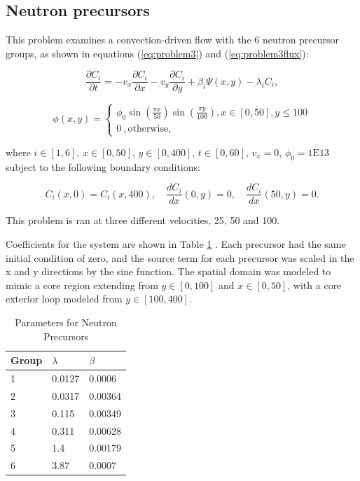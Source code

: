 \subsection{Neutron precursors}
This problem examines a convection-driven flow with the 6 neutron precursor groups, as shown in equations (\ref{eq:problem3}) and (\ref{eq:problem3flux}): 

\begin{equation}
\frac{\partial C_{i}}{\partial t} = -v_{x}\frac{\partial C_{i}}{\partial x} - v_{y}\frac{\partial C_{i}}{\partial y} + \beta_{i} \Psi (x, y) -\lambda_i C_{i},
\label{eq:problem3}
\end{equation}

\begin{equation}
\phi (x, y) = \begin{cases}
  \phi _0 \sin\left(\frac{\pi x}{50}\right)\sin\left(\frac{\pi y}{100}\right) , x \in [0,50], y \le 100 \\
  0\ , \text{otherwise},
  \label{eq:problem3flux}
\end{cases}
\end{equation}

\noindent where $i \in [1,6]$, $x \in [0, 50]$, $y \in [0, 400]$, $t \in [0, 60]$, $v_{x} = 0$, $\phi_0 = 1\text{E}13$ subject to the following boundary conditions:

\begin{equation}
    C_{i}(x,0) = C_{i}(x,400), \quad \frac{dC_{i}}{dx}(0,y) = 0, \quad \frac{dC_{i}}{dx}(50, y) = 0.
\end{equation}

\noindent This problem is ran at three different velocities, 25, 50 and 100. 

Coefficients for the system are shown in Table \ref{tab:precursorCoeffs} \cite{ott1985}. 
Each precursor had the same initial condition of zero, and the source term for each precursor was scaled in the x and y directions by the sine function. The spatial domain was modeled to mimic a core region extending from $y \in [0,100]$ and $x \in [0,50]$, with a core exterior loop modeled from $y \in [100, 400]$. 

\begin{table}[h!]
   \caption{\label{tab:precursorCoeffs} Parameters for Neutron Precursors}
   \centering
   \begin{tabular}{lll}
   \hline
   Group & $\lambda$ & $\beta$ \\
   \hline
   1 & 0.0127 & 0.0006 \\
   2 & 0.0317 & 0.00364 \\
   3 & 0.115 & 0.00349 \\
   4 & 0.311& 0.00628 \\
   5 & 1.4 & 0.00179\\
   6 & 3.87 & 0.0007 \\
   \hline
   \end{tabular}
\end{table} 

